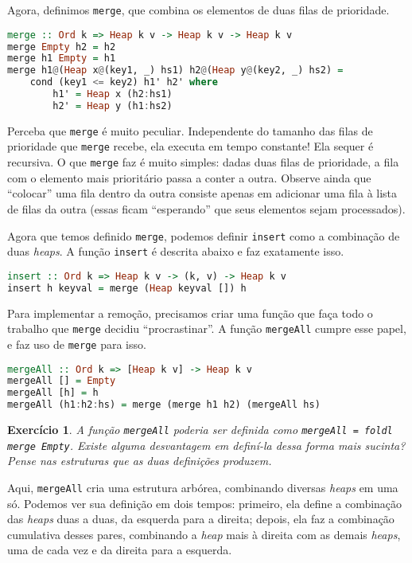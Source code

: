 \documentclass[a4paper]{article}
\newtheorem{exercicio}{Exercício}
\begin{document}
Agora, definimos \texttt{merge}, que combina os elementos de duas filas de prioridade.

\begin{lstlisting}[language=haskell, frame=single]
merge :: Ord k => Heap k v -> Heap k v -> Heap k v
merge Empty h2 = h2
merge h1 Empty = h1
merge h1@(Heap x@(key1, _) hs1) h2@(Heap y@(key2, _) hs2) =
	cond (key1 <= key2) h1' h2' where
		h1' = Heap x (h2:hs1)
		h2' = Heap y (h1:hs2)
\end{lstlisting}

Perceba que \texttt{merge} é muito peculiar.
Independente do tamanho das filas de prioridade que \texttt{merge} recebe, ela executa em tempo constante!
Ela sequer é recursiva.
O que \texttt{merge} faz é muito simples: dadas duas filas de prioridade, a fila com o elemento mais prioritário passa a conter a outra.
Observe ainda que ``colocar'' uma fila dentro da outra consiste apenas em adicionar uma fila à lista de filas da outra (essas ficam ``esperando'' que seus elementos sejam processados).

Agora que temos definido \texttt{merge}, podemos definir \texttt{insert} como a combinação de duas \emph{heaps}.
A função \texttt{insert} é descrita abaixo e faz exatamente isso.

\begin{lstlisting}[language=haskell, frame=single]
insert :: Ord k => Heap k v -> (k, v) -> Heap k v
insert h keyval = merge (Heap keyval []) h
\end{lstlisting}

Para implementar a remoção, precisamos criar uma função que faça todo o trabalho que \texttt{merge} decidiu ``procrastinar''.
A função \texttt{mergeAll} cumpre esse papel, e faz uso de \texttt{merge} para isso.

\begin{lstlisting}[language=haskell, frame=single]
mergeAll :: Ord k => [Heap k v] -> Heap k v
mergeAll [] = Empty
mergeAll [h] = h
mergeAll (h1:h2:hs) = merge (merge h1 h2) (mergeAll hs)
\end{lstlisting}

\begin{exercicio}
	A função \emph{\texttt{mergeAll}} poderia ser definida como \emph{\texttt{mergeAll = foldl merge Empty}}.
	Existe alguma desvantagem em definí-la dessa forma mais sucinta?
	Pense nas estruturas que as duas definições produzem.
\end{exercicio}

Aqui, \texttt{mergeAll} cria uma estrutura arbórea, combinando diversas \emph{heaps} em uma só.
Podemos ver sua definição em dois tempos: primeiro, ela define a combinação das \emph{heaps} duas a duas, da esquerda para a direita; depois, ela faz a combinação cumulativa desses pares, combinando a \emph{heap} mais à direita com as demais \emph{heaps}, uma de cada vez e da direita para a esquerda.
\end{document}
